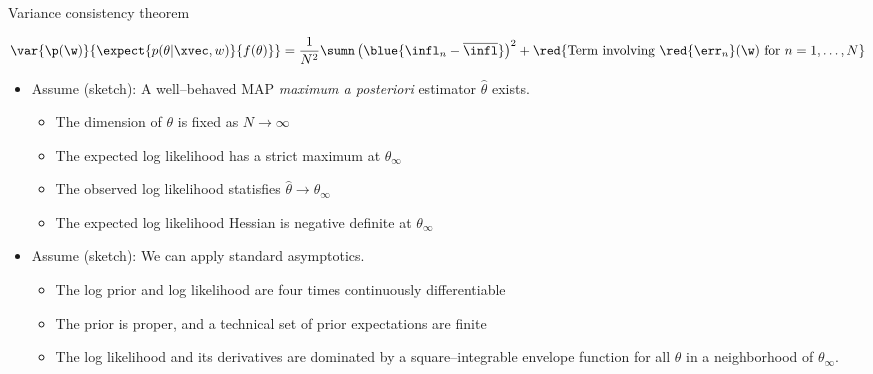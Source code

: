 \begin{frame}[t]{Variance consistency theorem}

%
\begin{align*}
    \var{\p(\w)}{\expect{p(\theta \vert \xvec, w)}{f(\theta)}}
    = 
    \frac{1}{N^2} \sumn \left(
        \blue{\infl_n - \overline{\infl}}
    \right)^2 +
    \red{\textrm{Term involving }
        \red{\err_n}(\w)
        \textrm{ for }n =1,\dots,N
    }
\end{align*}
%
\def\thetatrue{\theta_{\infty}}
\def\thetahat{\hat\theta}


\def\normdist{\mathcal{N}}

\def\gcovtrue{V^g}
\def\gcovij{V^{\mathrm{IJ}}}

\pause
%
\begin{itemize}
    \item Assume (sketch): A well--behaved MAP \textit{maximum a posteriori} estimator $\thetahat$ exists.
    \begin{itemize}
        \item The dimension of $\theta$ is fixed as $N \rightarrow \infty$
        \item The expected log likelihood has a strict maximum at $\thetatrue$
        \item The observed log likelihood statisfies $\thetahat \rightarrow \thetatrue$
        \item The expected log likelihood Hessian is negative definite at $\thetatrue$ 
    \end{itemize}
    \item Assume (sketch): We can apply standard asymptotics.
    \begin{itemize}
    \item The log prior and log likelihood are four times continuously differentiable
    \item The prior is proper, and a technical set of prior expectations are finite
    \item The log likelihood and its derivatives are dominated by a square--integrable envelope function 
          for all $\theta$ in a neighborhood of $\theta_\infty$.
    \end{itemize}
\end{itemize}
%
\pause


\end{frame}
